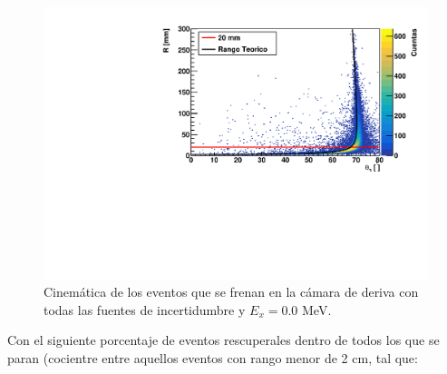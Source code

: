 \begin{figure}[H] \centering
    \includegraphics[width=0.6\linewidth]{Imagenes/Trigger/RangeTheta_Ex0.00_incIdx0.pdf}
    \caption{Cinemática de los eventos que se frenan en la cámara de deriva con todas las fuentes de incertidumbre y $E_x=0.0$ MeV.}
\end{figure}


Con el siguiente porcentaje de eventos rescuperales dentro de todos los que se paran (cocientre entre aquellos eventos con rango menor de 2 cm, tal que:

\begin{table}[H] \centering
        
\end{table}